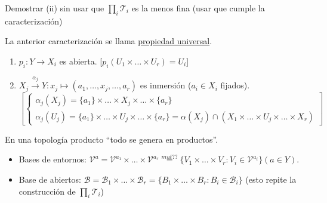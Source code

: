 \begin{ej}
Demostrar (ii) sin usar que $\prod_{i} \mathcal{T}_i$ es la menos fina (usar que cumple la caracterización)
\end{ej}

La anterior caracterización se llama \underline{propiedad universal}.

\begin{prop}
\begin{enumerate}
    \item $p_i: Y \rightarrow X_i$ es abierta. [$p_i\left( U_1 \times \ldots \times U_r \right) = U_i$]
    \item $X_j \xrightarrow{\alpha_j} Y: x_j \mapsto \left( a_1, \ldots, x_j, \ldots, a_r \right)$ es inmersión ($a_i \in X_i$ fijados).
    \[
    \left[\begin{cases}
        \alpha_j\left( X_j \right) = \{a_1\} \times \ldots \times X_j \times \ldots \times \{a_r\} \\
        \alpha_j\left( U_j \right) = \{a_1\} \times \ldots \times U_j \times \ldots \times \{a_r\} = \alpha\left( X_j \right) \cap \left( X_1 \times \ldots \times U_j \times \ldots \times X_r \right) 
    \end{cases}\right]     
    \]
\end{enumerate}
\end{prop}

\begin{pg}
En una topología producto ``todo se genera en productos''.
\begin{ej}
\begin{itemize}
    \item Bases de entornos: $\mathcal{V}^a = \mathcal{V}^{a_1} \times \ldots \times \mathcal{V}^{a_r} \stackrel{mut??}{=} \{V_1 \times \ldots \times V_r: V_i \in \mathcal{V}^{a_i}\} \left( a \in Y \right)$.
    \item Base de abiertos: $\mathcal{B} = \mathcal{B}_1 \times \ldots \times \mathcal{B}_r = \{B_1 \times \ldots \times B_r: B_i \in \mathcal{B}_i\}$ (esto repite la construcción de $\prod_{i} \mathcal{T}_i$)
\end{itemize}
\end{ej}
\end{pg}


